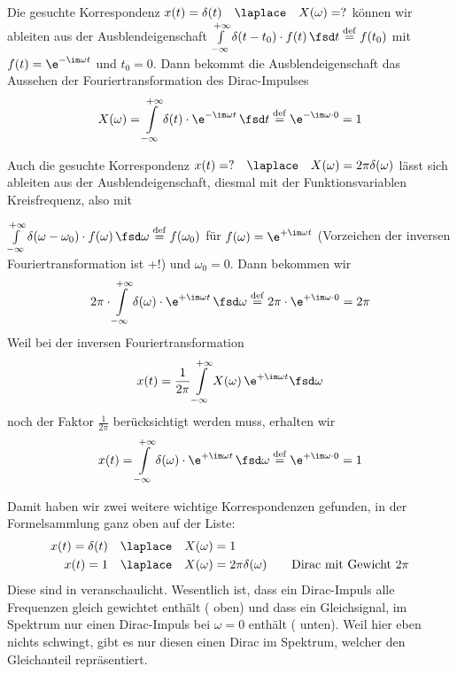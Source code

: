 \cleardoublepage
\begin{Ansatz}
Die gesuchte Korrespondenz $x(t)=\delta(t)\quad \laplace \quad X(\omega)=?$
können wir ableiten aus der Ausblendeigenschaft
$\int\limits_{-\infty}^{+\infty} \delta(t-t_0) \cdot f(t) \, \fsd t \stackrel{\mathrm{def}}= f(t_0)$
mit $f(t) = \e^{-\im \omega t}$ und $t_0=0$.
%
Dann bekommt die Ausblendeigenschaft das Aussehen der Fouriertransformation
des Dirac-Impulses
\begin{equation}
X(\omega) = \int\limits_{-\infty}^{+\infty} \delta(t) \cdot \e^{-\im \omega t} \, \fsd t \stackrel{\mathrm{def}}= \e^{-\im \omega \cdot 0} = 1
\end{equation}

Auch die gesuchte Korrespondenz
$x(t)= ? \quad \laplace \quad X(\omega)=2\pi \delta(\omega)$ lässt sich
ableiten aus der Ausblendeigenschaft, diesmal mit der Funktionsvariablen Kreisfrequenz, also mit

$\int\limits_{-\infty}^{+\infty} \delta(\omega-\omega_0) \cdot f(\omega) \, \fsd \omega \stackrel{\mathrm{def}}= f(\omega_0)$
für $f(\omega) = \e^{+\im \omega t}$ (Vorzeichen der inversen Fouriertransformation ist $+$!) und $\omega_0=0$.
%
Dann bekommen wir
\begin{equation}
2\pi \cdot \int\limits_{-\infty}^{+\infty} \delta(\omega) \cdot \e^{+\im \omega t} \, \fsd \omega \stackrel{\mathrm{def}}= 2\pi \cdot \e^{+\im \omega \cdot 0} = 2\pi
\end{equation}
%
Weil bei der inversen Fouriertransformation
\begin{align}
x(t) = \frac{1}{2\pi} \int\limits_{-\infty}^{+\infty} X(\omega) \, \e^{+\im \omega t} \fsd \omega
\end{align}
noch der Faktor $\frac{1}{2\pi}$ berücksichtigt werden muss, erhalten wir
\begin{equation}
x(t) = \int\limits_{-\infty}^{+\infty} \delta(\omega) \cdot \e^{+\im \omega t} \, \fsd \omega \stackrel{\mathrm{def}}= \e^{+\im \omega \cdot 0} = 1
\end{equation}

\end{Ansatz}
\begin{Loesung}
Damit haben wir zwei weitere wichtige Korrespondenzen gefunden, in der Formelsammlung
ganz oben auf der Liste:
\begin{align}
\label{eq:D410BDAAE0_Loesung1}
x(t)= \delta(t) &\quad \laplace \quad X(\omega)=1\\
\label{eq:D410BDAAE0_Loesung2}
x(t)= 1 &\quad \laplace \quad X(\omega)=2\pi \delta(\omega)\qquad \text{Dirac mit Gewicht}\,\,2\pi
\end{align}
%
Diese sind in  veranschaulicht.
%
Wesentlich ist, dass ein Dirac-Impuls alle Frequenzen gleich gewichtet enthält
( oben)
und dass ein Gleichsignal, im Spektrum nur einen Dirac-Impuls bei $\omega=0$ enthält
( unten).
Weil hier eben nichts schwingt, gibt es nur diesen einen Dirac im Spektrum, welcher den
Gleichanteil repräsentiert.
\end{Loesung}
